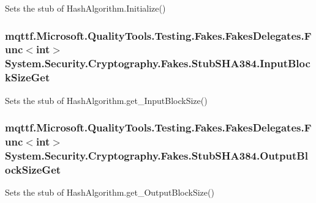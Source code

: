 Sets the stub of Hash\-Algorithm.\-Initialize()

\hypertarget{class_system_1_1_security_1_1_cryptography_1_1_fakes_1_1_stub_s_h_a384_a704d87e33522119e9b2719f37dc3cf15}{
\subsubsection[{Input\-Block\-Size\-Get}]{\setlength{\rightskip}{0pt plus 5cm}mqttf.\-Microsoft.\-Quality\-Tools.\-Testing.\-Fakes.\-Fakes\-Delegates.\-Func$<$int$>$ System.\-Security.\-Cryptography.\-Fakes.\-Stub\-S\-H\-A384.\-Input\-Block\-Size\-Get}}\label{class_system_1_1_security_1_1_cryptography_1_1_fakes_1_1_stub_s_h_a384_a704d87e33522119e9b2719f37dc3cf15}


Sets the stub of Hash\-Algorithm.\-get\-\_\-\-Input\-Block\-Size()

\hypertarget{class_system_1_1_security_1_1_cryptography_1_1_fakes_1_1_stub_s_h_a384_aee9159cc1b19961ceca6f27e7a6aca36}{
\subsubsection[{Output\-Block\-Size\-Get}]{\setlength{\rightskip}{0pt plus 5cm}mqttf.\-Microsoft.\-Quality\-Tools.\-Testing.\-Fakes.\-Fakes\-Delegates.\-Func$<$int$>$ System.\-Security.\-Cryptography.\-Fakes.\-Stub\-S\-H\-A384.\-Output\-Block\-Size\-Get}}\label{class_system_1_1_security_1_1_cryptography_1_1_fakes_1_1_stub_s_h_a384_aee9159cc1b19961ceca6f27e7a6aca36}


Sets the stub of Hash\-Algorithm.\-get\-\_\-\-Output\-Block\-Size()



